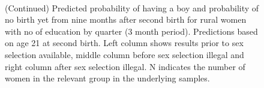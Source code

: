 \documentclass[12pt,letterpaper]{article}
\begin{document}
\begin{figure}[htpb]
{\begin{minipage}{0.31\textwidth}
        \captionsetup[subfigure]{labelformat=empty,position=top,captionskip=-1pt,farskip=-0.5pt}
        \\
        \captionsetup[subfigure]{labelformat=parens}
    \end{minipage}
}
\setcounter{subfigure}{6}
\caption{(Continued) Predicted probability of having a boy and probability of
no birth yet from nine months after second birth for rural
women with no of education by quarter (3 month period). 
Predictions based on age 21 at second birth.
Left column shows results prior to sex selection available, middle column before
sex selection illegal and right column after sex selection illegal.
N indicates the number of women in the relevant group in the underlying samples.
}
\end{figure}



\end{document}
